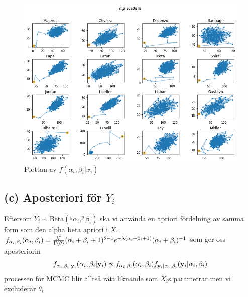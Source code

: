 \documentclass{assignment}
\begin{document}
\begin{figure}
    \includegraphics[width=180mm]{assets/mcmc_alpha_beta.png}
    \caption[short]{Plottan av $f(\alpha_i,\beta_i|x_i)$}
\end{figure}

\newpage
\subsection*{(c) Aposteriori för $Y_i$}
Eftersom $Y_i \sim \text{Beta}(^y\alpha_i,^y\beta_i)$ ska vi använda en apriori fördelning av samma form som den alpha beta apriori i $X$.
\\ $f_{\alpha_i,\beta_i}(\alpha_i,\beta_i) = \frac{\lambda^\theta}{\Gamma(\theta)}(\alpha_i+\beta_i+1)^{\theta-1}e^{-\lambda(\alpha_i+\beta_i+1)}(\alpha_i+\beta_i)^{-1}$  
som ger oss aposteriorin 
$$f_{\alpha_i,\beta_i|\mathbf{y}_i}(\alpha_i,\beta_i|\mathbf{y}_i)\propto f_{\alpha_i,\beta_i}(\alpha_i,\beta_i)f_{\mathbf{y}_i|\alpha_i,\beta_i}(\mathbf{y}_i|\alpha_i,\beta_i)$$
processen för MCMC blir alltså rätt liknande som $X_i$s parametrar men vi excluderar
$\theta_i$
\end{document}
